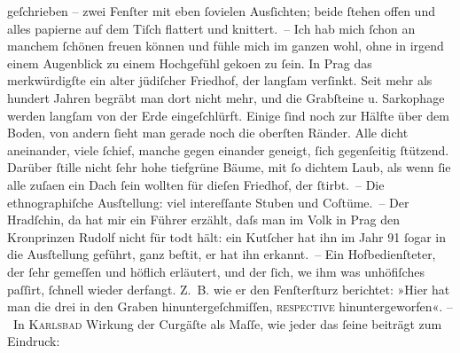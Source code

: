 \begin{ledgroupsized}[t]{13cm}
               geſchrieben – zwei Fenſter mit eben ſovielen Ausſichten; beide ſtehen offen und alles
               papierne {\pb}auf dem Tiſch flattert und knittert. – Ich hab
               mich ſchon an manchem ſchönen freuen können und fühle mich im ganzen wohl, ohne in
               irgend einem Augenblick zu einem Hochgefühl geko{\geminationm}en zu
               ſein. In Prag das merkwürdigſte ein alter jüdiſcher Friedhof, der
               langſam verſinkt. Seit mehr als hundert Jahren begräbt man dort nicht mehr, und die
               Grabſteine u. Sarkophage werden langſam von der Erde eingeſchlürft. Einige ſind noch
               zur Hälfte über dem Boden, von andern ſieht man gerade noch die oberſten Ränder. Alle
               dicht aneinander, viele ſchief, manche gegen einander geneigt, ſich gegenſeitig {\pb}ſtützend. Darüber ſtille nicht ſehr hohe tiefgrüne Bäume,
               mit ſo dichtem Laub, als wenn ſie alle zuſa{\geminationm}en ein Dach
               ſein wollten für dieſen Friedhof, der ſtirbt. – Die ethnographiſche
                  Ausſtellung: viel intereſſante Stuben und Coſtüme. – Der Hradſchin, da hat mir ein Führer erzählt, daſs man im Volk in
                  Prag den Kronprinzen Rudolf nicht für todt hält: ein Kutſcher hat ihn im Jahr
                  91{ }ſogar in die Ausſtellung geführt, ganz beſti{\geminationm}t, er hat ihn erkannt. – Ein Hofbedienſteter, der ſehr
               gemeſſen und höflich erläutert, und der ſich, we{\geminationn} ihm
               was unhöfiſches paſſirt, ſchnell wieder derfangt. Z. B. {\pb}wie er den Fenſterſturz berichtet: »Hier hat man die drei in den Graben
               hinuntergeſchmiſſen, \textsc{reſpective} hinuntergeworfen«.\pend
           \pstart
           – In \textsc{Karlsbad} Wirkung der Curgäſte als Maſſe, wie jeder das ſeine beiträgt zum Eindruck:

\end{ledgroupsized}
